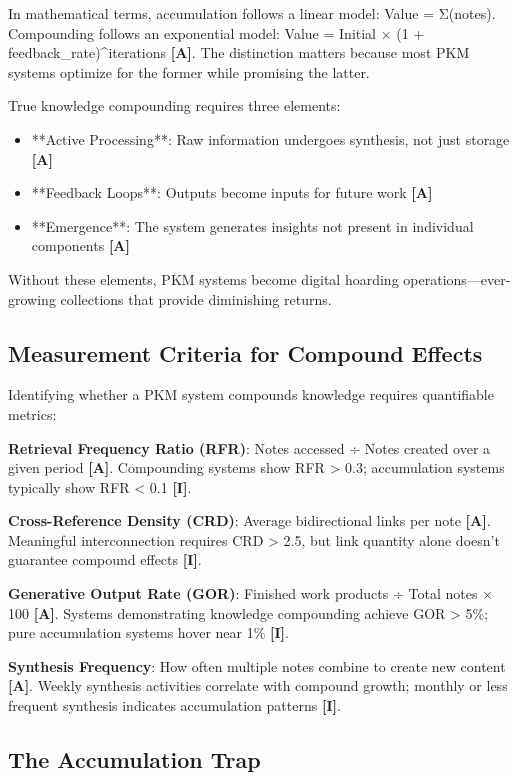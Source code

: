 \documentclass[a4paper,11pt]{article}
\newcommand{\ilabel}{\textbf{\textcolor{icolor}{[I]}}}
\newcommand{\alabel}{\textbf{\textcolor{acolor}{[A]}}}
\begin{document}
In mathematical terms, accumulation follows a linear model: Value = Σ(notes). Compounding follows an exponential model: Value = Initial × (1 + feedback\_rate)\textasciicircum{}iterations \alabel{}. The distinction matters because most PKM systems optimize for the former while promising the latter.


True knowledge compounding requires three elements:


\begin{itemize}
  \item **Active Processing**: Raw information undergoes synthesis, not just storage \alabel{}
  \item **Feedback Loops**: Outputs become inputs for future work \alabel{}
  \item **Emergence**: The system generates insights not present in individual components \alabel{}
\end{itemize}

Without these elements, PKM systems become digital hoarding operations—ever-growing collections that provide diminishing returns.


\subsection{Measurement Criteria for Compound Effects}

Identifying whether a PKM system compounds knowledge requires quantifiable metrics:


\textbf{Retrieval Frequency Ratio (RFR)}: Notes accessed ÷ Notes created over a given period \alabel{}. Compounding systems show RFR > 0.3; accumulation systems typically show RFR < 0.1 \ilabel{}.


\textbf{Cross-Reference Density (CRD)}: Average bidirectional links per note \alabel{}. Meaningful interconnection requires CRD > 2.5, but link quantity alone doesn't guarantee compound effects \ilabel{}.


\textbf{Generative Output Rate (GOR)}: Finished work products ÷ Total notes × 100 \alabel{}. Systems demonstrating knowledge compounding achieve GOR > 5\%; pure accumulation systems hover near 1\% \ilabel{}.


\textbf{Synthesis Frequency}: How often multiple notes combine to create new content \alabel{}. Weekly synthesis activities correlate with compound growth; monthly or less frequent synthesis indicates accumulation patterns \ilabel{}.


\subsection{The Accumulation Trap}
\end{document}
